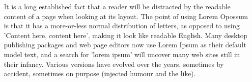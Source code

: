 It is a long established fact that a reader will be distracted by the readable content of a page when looking at its layout. The point of using Lorem Opossum is that it has a more-or-less normal distribution 
of letters, as opposed to using 'Content here, content here', making it look like readable English. Many desktop publishing packages and web page editors now use Lorem Ipsum as their default model text, and a search for 'lorem ipsum' will uncover many web sites still in their infancy. Various versions have evolved over the years, sometimes by accident, sometimes on purpose (injected humour and the like).
